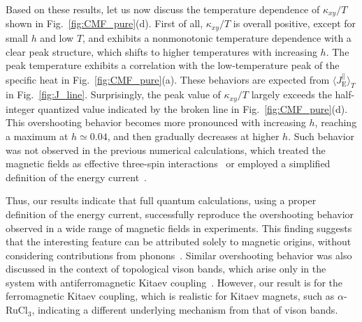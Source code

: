 \documentclass[twocolumn,superscriptaddress,showpacs, longbibliography, aps, prx]{revtex4-2}
\begin{document}
Based on these results, let us now discuss the temperature dependence of $\kappa_{xy}/T$ shown in Fig.~\ref{fig:CMF_pure}(d). First of all, $\kappa_{xy}/T$ is overall positive, except for small $h$ and low $T$, and exhibits a nonmonotonic temperature dependence with a clear peak structure, which shifts to higher temperatures with increasing $h$. 
The peak temperature exhibits a correlation with the low-temperature peak of the specific heat in Fig.~\ref{fig:CMF_pure}(a).
These behaviors are expected from $\langle J_{\mathrm{E}}^\parallel \rangle_T$ in Fig.~\ref{fig:J_line}. 
Surprisingly, the peak value of $\kappa_{xy}/T$ largely exceeds the half-integer quantized value indicated by the broken line in Fig.~\ref{fig:CMF_pure}(d). 
This overshooting behavior becomes more pronounced with increasing $h$, reaching a maximum at $h\simeq 0.04$, and then gradually decreases at higher $h$. 
Such behavior was not observed in the previous numerical calculations, which treated the magnetic fields as effective three-spin interactions~\cite{NasuYM2017} or employed a simplified definition of the energy current~\cite{KumarT2023}. 

Thus, our results indicate that full quantum calculations, using a proper definition of the energy current, successfully reproduce the overshooting behavior observed in a wide range of magnetic fields in experiments. 
This finding suggests that the interesting feature can be attributed solely to magnetic origins, without considering contributions from phonons~\cite{Ye2018Quantization,Vinkler2018}. 
Similar overshooting behavior was also discussed in the context of topological vison bands, which arise only in the system with antiferromagnetic Kitaev coupling~\cite{Joy2022}. 
However, our result is for the ferromagnetic Kitaev coupling, which is realistic for Kitaev magnets, such as $\alpha$-RuCl$_3$, indicating a different underlying mechanism from that of vison bands. 
\end{document}
